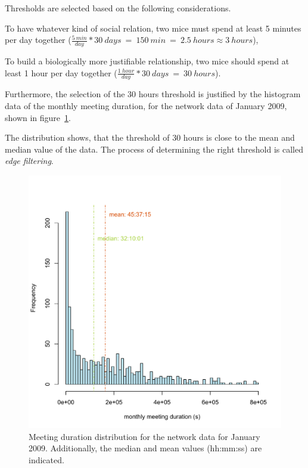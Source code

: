Thresholds are selected based on the following considerations.
\begin{mylist}
\item To have whatever kind of social relation, two mice must spend at least 5 minutes per day together ($\frac{5\:min}{day} * 30\:days\:=\:150\:min\:=\:2.5\:hours \approx 3\:hours$),
\item To build a biologically more justifiable relationship, two mice should spend at least 1 hour per day together ($\frac{1\:hour}{day} * 30\:days\:=\:30\:hours$).
\end{mylist}

Furthermore, the selection of the 30 hours threshold is justified by the histogram data of the monthly meeting duration, for the network data of January 2009, shown in figure~\ref{fig:meeting_frequency_january}.

The distribution shows, that the threshold of 30 hours is close to the mean and median value of the data. The process of determining the right threshold is called \textit{edge filtering}.

\begin{figure}[htpb]
\begin{center}
  \includegraphics[width=.75\textwidth]{assets/pdf/meeting_frequency_january.pdf}
  \caption[Histogram of monthly meeting duration]{Meeting duration distribution for the network data for January 2009. Additionally, the median and mean values (hh:mm:ss) are indicated.}
  \label{fig:meeting_frequency_january}
\end{center}
\end{figure}   

